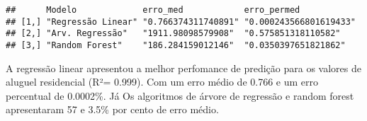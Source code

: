 \documentclass[
]{article}
\newenvironment{Shaded}{\begin{snugshade}}{\end{snugshade}}
\newcommand{\DecValTok}[1]{\textcolor[rgb]{0.00,0.00,0.81}{#1}}
\newcommand{\KeywordTok}[1]{\textcolor[rgb]{0.13,0.29,0.53}{\textbf{#1}}}
\newcommand{\NormalTok}[1]{#1}
\newcommand{\OperatorTok}[1]{\textcolor[rgb]{0.81,0.36,0.00}{\textbf{#1}}}
\newcommand{\StringTok}[1]{\textcolor[rgb]{0.31,0.60,0.02}{#1}}
\begin{document}
\begin{Shaded}
\end{Shaded}

\begin{verbatim}
##      Modelo             erro_med            erro_permed           
## [1,] "Regressão Linear" "0.766374311740891" "0.000243566801619433"
## [2,] "Arv. Regressão"   "1911.98098579908"  "0.575851318110582"   
## [3,] "Random Forest"    "186.284159012146"  "0.0350397651821862"
\end{verbatim}

A regressão linear apresentou a melhor perfomance de predição para os
valores de aluguel residencial (R²= 0.999). Com um erro médio de 0.766 e
um erro percentual de 0.0002\%. Já Os algoritmos de árvore de regressão
e random forest apresentaram 57 e 3.5\% por cento de erro médio.
\end{document}
